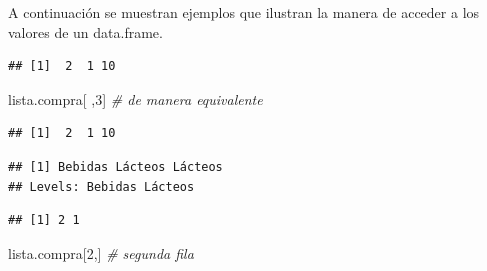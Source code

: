 \documentclass[]{book}
\newenvironment{Shaded}{\begin{snugshade}}{\end{snugshade}}
\newcommand{\DecValTok}[1]{\textcolor[rgb]{0.00,0.00,0.81}{#1}}
\newcommand{\CommentTok}[1]{\textcolor[rgb]{0.56,0.35,0.01}{\textit{#1}}}
\newcommand{\OperatorTok}[1]{\textcolor[rgb]{0.81,0.36,0.00}{\textbf{#1}}}
\newcommand{\NormalTok}[1]{#1}
\begin{document}
A continuación se muestran ejemplos que ilustran la manera de acceder a
los valores de un data.frame.

\begin{Shaded}
\end{Shaded}

\begin{verbatim}
## [1]  2  1 10
\end{verbatim}

\begin{Shaded}
\begin{Highlighting}[]
\NormalTok{lista.compra[ ,}\DecValTok{3}\NormalTok{]  }\CommentTok{# de manera equivalente}
\end{Highlighting}
\end{Shaded}

\begin{verbatim}
## [1]  2  1 10
\end{verbatim}

\begin{Shaded}
\end{Shaded}

\begin{verbatim}
## [1] Bebidas Lácteos Lácteos
## Levels: Bebidas Lácteos
\end{verbatim}

\begin{Shaded}
\end{Shaded}

\begin{verbatim}
## [1] 2 1
\end{verbatim}

\begin{Shaded}
\begin{Highlighting}[]
\NormalTok{lista.compra[}\DecValTok{2}\NormalTok{,]  }\CommentTok{# segunda fila}
\end{Highlighting}
\end{Shaded}
\end{document}
